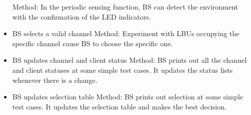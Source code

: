 \begin{itemize}
  Method: In the periodic sensing function, BS can detect the environment with the confirmation of the LED indicators.
  \item BS selects a valid channel\newline 
  Method: Experiment with LBUs occupying the specific channel cause BS to choose the specific one. 
  \item BS updates channel and client status\newline
  Method: BS prints out all the channel and client statuses at some simple test cases. It updates the status lists whenever there is a change.
  \item BS updates selection table\newline
  Method: BS prints out selection at some simple test cases. It updates the selection table and makes the best decision.
\end{itemize}
